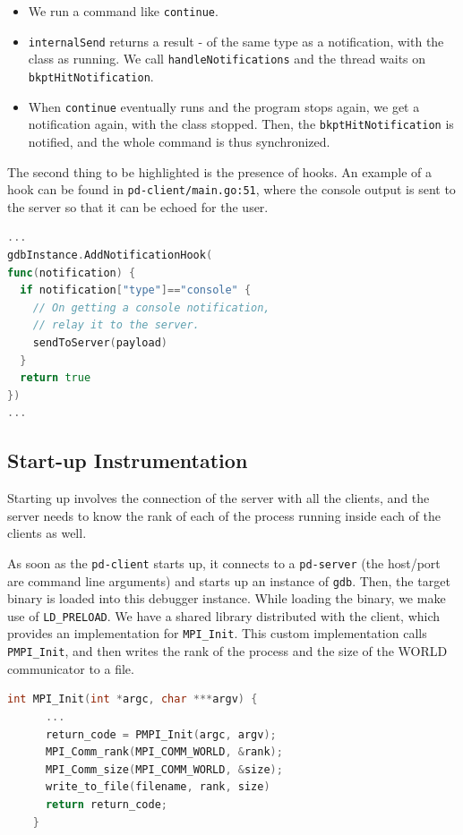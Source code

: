 \documentclass[10pt,conference]{IEEEtran}
\begin{document}
\begin{itemize}
  \item We run a command like \texttt{continue}.
  \item \texttt{internalSend} returns a result - of the same type as a notification, with
    the class as running. We call \texttt{handleNotifications} and the thread waits on \texttt{bkptHitNotification}.
  \item When \texttt{continue} eventually runs and the program stops again, we get a notification again, with the class stopped. Then, the \texttt{bkptHitNotification} is notified, and the whole command is thus synchronized.
\end{itemize}

The second thing to be highlighted is the presence of hooks. An example of a hook can be found in \texttt{pd-client/main.go:51}, where the console output is sent to the server so that it can be echoed for the user.

\begin{samepage}
  \begin{lstlisting}[language=Go, caption=Custom hooks for notifications]
...
gdbInstance.AddNotificationHook(
func(notification) {
  if notification["type"]=="console" {
    // On getting a console notification,
    // relay it to the server.
    sendToServer(payload)
  }
  return true
})
...
\end{lstlisting}
\end{samepage}

\subsection{Start-up Instrumentation}

Starting up involves the connection of the server with all the clients, and the server needs to know the rank of each of the process running inside each of the clients as well.

As soon as the \texttt{pd-client} starts up, it connects to a \texttt{pd-server} (the host/port are command line arguments) and starts up an instance of \texttt{gdb}. Then, the target binary is loaded into this debugger instance. While loading the binary, we make use of \texttt{LD\_PRELOAD}. We have a shared library distributed with the client, which provides an implementation for \texttt{MPI\_Init}. This custom implementation calls \texttt{PMPI\_Init}, and then writes the rank of the process and the size of the WORLD communicator to a file.

\begin{samepage}
  \begin{lstlisting}[language=C, caption=Start-up instrumentation]
    int MPI_Init(int *argc, char ***argv) {
      ...
      return_code = PMPI_Init(argc, argv);
      MPI_Comm_rank(MPI_COMM_WORLD, &rank);
      MPI_Comm_size(MPI_COMM_WORLD, &size);
      write_to_file(filename, rank, size)
      return return_code;
    }
  \end{lstlisting}
\end{samepage}
\end{document}
